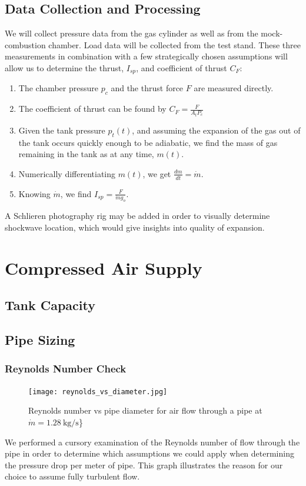 \documentclass{article}
\begin{document}
\subsection*{Data Collection and Processing}
We will collect pressure data from the gas cylinder as well as from the mock-combustion chamber. Load data will be collected from the test stand. These three measurements in combination with a few strategically chosen assumptions will allow us to determine the thrust, $I_{sp}$, and coefficient of thrust $C_F$:
\begin{enumerate}
\item The chamber pressure $p_c$ and the thrust force $F$ are measured directly.
\item The coefficient of thrust can be found by $C_F = \frac{F}{A_t P_c}$
\item Given the tank pressure $p_t(t)$, and assuming the expansion of the gas out of the tank occurs quickly enough to be adiabatic, we find the mass of gas remaining in the tank as at any time, $m(t)$.
\item Numerically differentiating $m(t)$, we get $ \frac{dm}{dt} = \dot{m}$.
\item Knowing $\dot{m}$, we find $I_{sp} = \frac{F}{\dot{m} g_o}$.
\end{enumerate}
A Schlieren photography rig may be added in order to visually determine shockwave location, which would give insights into quality of expansion. 

\section*{Compressed Air Supply}

\subsection*{Tank Capacity}

\subsection*{Pipe Sizing}
\subsubsection*{Reynolds Number Check}
\begin{figure}[h!]
\centering
\texttt{[image: reynolds\_vs\_diameter.jpg]}
\caption{Reynolds number vs pipe diameter for air flow through a pipe at $\dot{m} = \SI{1.28}{\kg\per\second}$\}} 
\label{reynolds}
\end{figure}
We performed a cursory examination of the Reynolds number of flow through the pipe in order to determine which assumptions we could apply when determining the pressure drop per meter of pipe. This graph illustrates the reason for our choice to assume fully turbulent flow.
\end{document}
